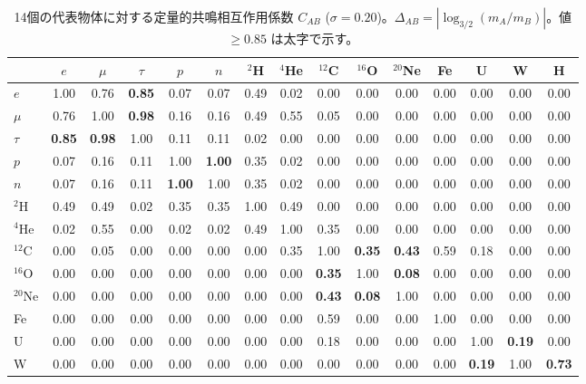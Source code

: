 \documentclass[11pt,a4paper]{article}
\theoremstyle{remark}
\begin{document}
	\begin{table}[H]
		\centering
		\caption{14個の代表物体に対する定量的共鳴相互作用係数 \(C_{AB}\) (\(\sigma = 0.20\))。\(\Delta_{AB} = |\log_{3/2}(m_A/m_B)|\)。値 \(\ge 0.85\) は太字で示す。}
		\label{tab:CAB}
		\scriptsize
		\begin{tabular}{l c c c c c c c c c c c c c c}
			\toprule
			& \(e\) & \(\mu\) & \(\tau\) & \(p\) & \(n\) & \(^2\)H & \(^4\)He & \(^{12}\)C & \(^{16}\)O & \(^{20}\)Ne & Fe & U & W & H \\
			\midrule
			\(e\) & 1.00 & 0.76 & \textbf{0.85} & 0.07 & 0.07 & 0.49 & 0.02 & 0.00 & 0.00 & 0.00 & 0.00 & 0.00 & 0.00 & 0.00 \\
			\(\mu\) & 0.76 & 1.00 & \textbf{0.98} & 0.16 & 0.16 & 0.49 & 0.55 & 0.05 & 0.00 & 0.00 & 0.00 & 0.00 & 0.00 & 0.00 \\
			\(\tau\) & \textbf{0.85} & \textbf{0.98} & 1.00 & 0.11 & 0.11 & 0.02 & 0.00 & 0.00 & 0.00 & 0.00 & 0.00 & 0.00 & 0.00 & 0.00 \\
			\(p\) & 0.07 & 0.16 & 0.11 & 1.00 & \textbf{1.00} & 0.35 & 0.02 & 0.00 & 0.00 & 0.00 & 0.00 & 0.00 & 0.00 & 0.00 \\
			\(n\) & 0.07 & 0.16 & 0.11 & \textbf{1.00} & 1.00 & 0.35 & 0.02 & 0.00 & 0.00 & 0.00 & 0.00 & 0.00 & 0.00 & 0.00 \\
			\(^2\)H & 0.49 & 0.49 & 0.02 & 0.35 & 0.35 & 1.00 & 0.49 & 0.00 & 0.00 & 0.00 & 0.00 & 0.00 & 0.00 & 0.00 \\
			\(^4\)He & 0.02 & 0.55 & 0.00 & 0.02 & 0.02 & 0.49 & 1.00 & 0.35 & 0.00 & 0.00 & 0.00 & 0.00 & 0.00 & 0.00 \\
			\(^{12}\)C & 0.00 & 0.05 & 0.00 & 0.00 & 0.00 & 0.00 & 0.35 & 1.00 & \textbf{0.35} & \textbf{0.43} & 0.59 & 0.18 & 0.00 & 0.00 \\
			\(^{16}\)O & 0.00 & 0.00 & 0.00 & 0.00 & 0.00 & 0.00 & 0.00 & \textbf{0.35} & 1.00 & \textbf{0.08} & 0.00 & 0.00 & 0.00 & 0.00 \\
			\(^{20}\)Ne & 0.00 & 0.00 & 0.00 & 0.00 & 0.00 & 0.00 & 0.00 & \textbf{0.43} & \textbf{0.08} & 1.00 & 0.00 & 0.00 & 0.00 & 0.00 \\
			Fe & 0.00 & 0.00 & 0.00 & 0.00 & 0.00 & 0.00 & 0.00 & 0.59 & 0.00 & 0.00 & 1.00 & 0.00 & 0.00 & 0.00 \\
			U & 0.00 & 0.00 & 0.00 & 0.00 & 0.00 & 0.00 & 0.00 & 0.18 & 0.00 & 0.00 & 0.00 & 1.00 & \textbf{0.19} & 0.00 \\
			W & 0.00 & 0.00 & 0.00 & 0.00 & 0.00 & 0.00 & 0.00 & 0.00 & 0.00 & 0.00 & 0.00 & \textbf{0.19} & 1.00 & \textbf{0.73} \\

\end{tabular}
\end{table}
\end{document}
